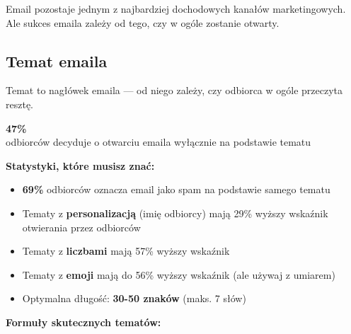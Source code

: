 \documentclass[
  12pt,
  a4paper,
  twoside,
  openright,
  12pt,
  DIV=12,
  BCOR=12mm]{scrbook}
\providecommand{\tightlist}{%
  \setlength{\itemsep}{0pt}\setlength{\parskip}{0pt}}\usepackage{longtable,booktabs,array}
\newcommand{\stathighlight}[2]{%
  \begin{center}
    \begin{tcolorbox}[
      enhanced,
      colback=primarylight,
      colframe=primaryblue,
      boxrule=1pt,
      arc=5pt,
      width=0.6\textwidth,
      halign=center
    ]
      {\fontsize{36}{40}\selectfont\bfseries\color{primarydark}#1}\\[5pt]
      {\color{textmuted}#2}
    \end{tcolorbox}
  \end{center}
}
\begin{document}
Email pozostaje jednym z najbardziej dochodowych kanałów marketingowych.
Ale sukces emaila zależy od tego, czy w ogóle zostanie otwarty.

\subsection{Temat emaila}\label{temat-emaila}

Temat to nagłówek emaila --- od niego zależy, czy odbiorca w ogóle
przeczyta resztę.

\stathighlight{47\%}{odbiorców decyduje o otwarciu emaila wyłącznie na podstawie tematu}

\textbf{Statystyki, które musisz znać:}

\begin{itemize}
\tightlist
\item
  \textbf{69\%} odbiorców oznacza email jako spam na podstawie samego
  tematu
\item
  Tematy z \textbf{personalizacją} (imię odbiorcy) mają 29\% wyższy
  wskaźnik otwierania przez odbiorców
\item
  Tematy z \textbf{liczbami} mają 57\% wyższy wskaźnik
\item
  Tematy z \textbf{emoji} mają do 56\% wyższy wskaźnik (ale używaj z
  umiarem)
\item
  Optymalna długość: \textbf{30-50 znaków} (maks. 7 słów)
\end{itemize}

\textbf{Formuły skutecznych tematów:}
\end{document}
